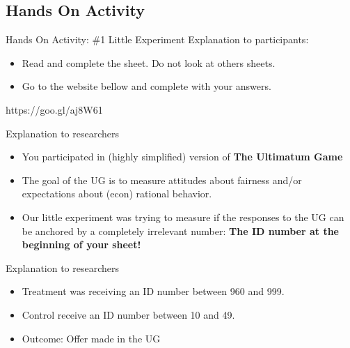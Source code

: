 \documentclass{beamer}
\begin{document}
\def\tightlist{}

\subsection{Hands On Activity}\label{lets-start-with-a-little-experiment}

\begin{frame}{Hands On Activity: \#1 Little Experiment}
 \Large{Explanation to participants:}

\begin{itemize}
\tightlist
\item
  \Large{Read and complete the sheet. Do not look at others sheets.}
\end{itemize}

\bigskip 

\begin{itemize}
\tightlist
\item
  \Large{Go to the website bellow and complete with your answers.}
\end{itemize}

\begin{center}
\LARGE{https://goo.gl/aj8W61}  
\end{center}

\end{frame}


\begin{frame}{Explanation to researchers}

\begin{itemize}
\item
  You participated in (highly simplified) version of \textbf{The
  Ultimatum Game}
\item
  The goal of the UG is to measure attitudes about fairness and/or
  expectations about (econ) rational behavior.
\item
  Our little experiment was trying to measure if the responses to the UG
  can be anchored by a completely irrelevant number: \textbf{The ID
  number at the beginning of your sheet!}
\end{itemize}

\end{frame}

\begin{frame}{Explanation to researchers}

\begin{itemize}
\item
  Treatment was receiving an ID number between 960 and 999.
\item
  Control receive an ID number between 10 and 49.
\item
  Outcome: Offer made in the UG
\end{itemize}

\end{frame}
\end{document}
